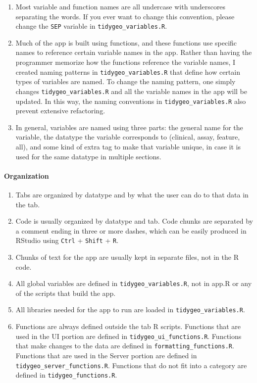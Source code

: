\documentclass[]{article}
\providecommand{\tightlist}{%
  \setlength{\itemsep}{0pt}\setlength{\parskip}{0pt}}
\let\oldparagraph\paragraph
\renewcommand{\paragraph}[1]{\oldparagraph{#1}\mbox{}}
\begin{document}
\begin{enumerate}
\def\labelenumi{\arabic{enumi}.}
\tightlist
\item
  Most variable and function names are all undercase with underscores
  separating the words. If you ever want to change this convention,
  please change the \texttt{SEP} variable in
  \texttt{tidygeo\_variables.R}.
\item
  Much of the app is built using functions, and these functions use
  specific names to reference certain variable names in the app. Rather
  than having the programmer memorize how the functions reference the
  variable names, I created naming patterns in
  \texttt{tidygeo\_variables.R} that define how certain types of
  variables are named. To change the naming pattern, one simply changes
  \texttt{tidygeo\_variables.R} and all the variable names in the app
  will be updated. In this way, the naming conventions in
  \texttt{tidygeo\_variables.R} also prevent extensive refactoring.
\item
  In general, variables are named using three parts: the general name
  for the variable, the datatype the variable corresponds to (clinical,
  assay, feature, all), and some kind of extra tag to make that variable
  unique, in case it is used for the same datatype in multiple sections.
\end{enumerate}

\paragraph{Organization}\label{organization}

\begin{enumerate}
\def\labelenumi{\arabic{enumi}.}
\tightlist
\item
  Tabs are organized by datatype and by what the user can do to that
  data in the tab.
\item
  Code is usually organized by datatype and tab. Code chunks are
  separated by a comment ending in three or more dashes, which can be
  easily produced in RStudio using \texttt{Ctrl} + \texttt{Shift} +
  \texttt{R}.
\item
  Chunks of text for the app are usually kept in separate files, not in
  the R code.
\item
  All global variables are defined in \texttt{tidygeo\_variables.R}, not
  in app.R or any of the scripts that build the app.
\item
  All libraries needed for the app to run are loaded in
  \texttt{tidygeo\_variables.R}.
\item
  Functions are always defined outside the tab R scripts. Functions that
  are used in the UI portion are defined in
  \texttt{tidygeo\_ui\_functions.R}. Functions that make changes to the
  data are defined in \texttt{formatting\_functions.R}. Functions that
  are used in the Server portion are defined in
  \texttt{tidygeo\_server\_functions.R}. Functions that do not fit into
  a category are defined in \texttt{tidygeo\_functions.R}.
\end{enumerate}
\end{document}
